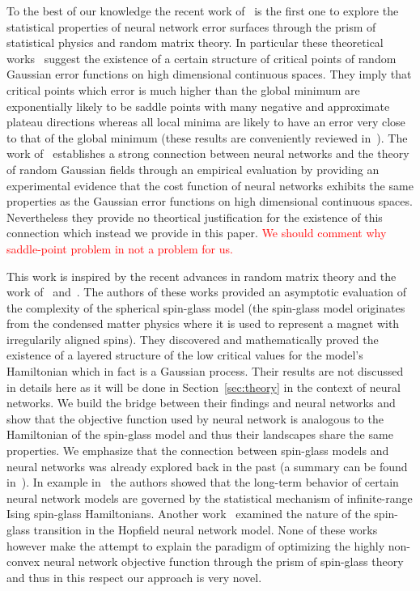 \documentclass[twoside]{article}
\begin{document}
To the best of our knowledge the recent work of~\cite{DBLP:journals/corr/DauphinPGCGB14} is the first one to explore the statistical properties of neural network error surfaces through the prism of statistical physics and random matrix theory. In particular these theoretical works~\cite{Bray2007,Fyodorov2007,Baldi:1989:NNP:70359.70362,wigner_semicircle} suggest the existence of a certain structure of critical points of random Gaussian error functions on high dimensional continuous spaces. They imply that critical points which error is much higher than the global minimum are exponentially likely to be saddle points with many negative and approximate plateau directions whereas all local minima are likely to have an error very close to that of the global minimum (these results are conveniently reviewed in~\cite{DBLP:journals/corr/DauphinPGCGB14}). The work of~\cite{DBLP:journals/corr/DauphinPGCGB14} establishes a strong connection between neural networks and the theory of random Gaussian fields through an empirical evaluation by providing an experimental evidence that the cost function of neural networks exhibits the same properties as the Gaussian error functions on high dimensional continuous spaces. Nevertheless they provide no theortical justification for the existence of this connection which instead we provide in this paper. \textcolor{red}{We should comment why saddle-point problem in not a problem for us.}

This work is inspired by the recent advances in random matrix theory and the work of~\cite{AAC2010} and~\cite{AAC2013}. The authors of these works provided an asymptotic evaluation of the complexity of the spherical spin-glass model (the spin-glass model originates from the condensed matter physics where it is used to represent a magnet with irregularily aligned spins). They discovered and mathematically proved the existence of a layered structure of the low critical values for the model's Hamiltonian which in fact is a Gaussian process. Their results are not discussed in details here as it will be done in Section~\ref{sec:theory} in the context of neural networks. We build the bridge between their findings and neural networks and show that the objective function used by neural network is analogous to the Hamiltonian of the spin-glass model and thus their landscapes share the same properties. We emphasize that the connection between spin-glass models and neural networks was already explored back in the past (a summary can be found in~\cite{Dotsenko1995}). In example in~\cite{PhysRevA.32.1007} the authors showed that the long-term behavior of certain neural network models are governed by the statistical mechanism of infinite-range Ising spin-glass Hamiltonians. Another work~\cite{0305-4470-30-23-009} examined the nature of the spin-glass transition in the Hopfield neural network model. None of these works however make the attempt to explain the paradigm of optimizing the highly non-convex neural network objective function through the prism of spin-glass theory and thus in this respect our approach is very novel.
\end{document}
